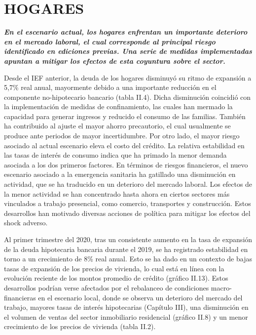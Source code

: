 \documentclass[
]{book}
\begin{document}
\hypertarget{HOG}{%
\section*{HOGARES}\label{HOG}}

\textbf{\emph{En el escenario actual, los hogares enfrentan un importante
deterioro en el mercado laboral, el cual corresponde al principal
riesgo identificado en ediciones previas. Una serie de medidas
implementadas apuntan a mitigar los efectos de esta coyuntura
sobre el sector.}}

Desde el IEF anterior, la deuda de los hogares disminuyó su ritmo de expansión
a 5,7\% real anual, mayormente debido a una importante reducción en el
componente no-hipotecario bancario (tabla II.4). Dicha disminución coincidió
con la implementación de medidas de confinamiento, las cuales han mermado la
capacidad para generar ingresos y reducido el consumo de las familias. También
ha contribuido al ajuste el mayor ahorro precautorio, el cual usualmente se
produce ante periodos de mayor incertidumbre. Por otro lado, el mayor riesgo
asociado al actual escenario eleva el costo del crédito. La relativa estabilidad
en las tasas de interés de consumo indica que ha primado la menor demanda
asociada a los dos primeros factores. En términos de riesgos financieros, el nuevo escenario asociado a la emergencia
sanitaria ha gatillado una disminución en actividad, que se ha traducido en
un deterioro del mercado laboral. Los efectos de la menor actividad se han
concentrado hasta ahora en ciertos sectores más vinculados a trabajo presencial,
como comercio, transportes y construcción. Estos desarrollos han motivado
diversas acciones de política para mitigar los efectos del shock adverso.

Al primer trimestre del 2020, tras un consistente aumento en la tasa de
expansión de la deuda hipotecaria bancaria durante el 2019, se ha registrado
estabilidad en torno a un crecimiento de 8\% real anual. Esto se ha dado en un
contexto de bajas tasas de expansión de los precios de vivienda, lo cual está en
línea con la evolución reciente de los montos promedio de crédito (gráfico II.13).
Estos desarrollos podrían verse afectados por el rebalanceo de condiciones
macro-financieras en el escenario local, donde se observa un deterioro del
mercado del trabajo, mayores tasas de interés hipotecarias (Capítulo III), una
disminución en el volumen de ventas del sector inmobiliario residencial (gráfico
II.8) y un menor crecimiento de los precios de vivienda (tabla II.2).
\end{document}
